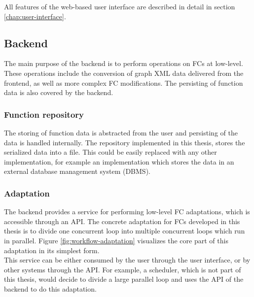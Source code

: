 \documentclass[a4paper,top=25mm,bottom=25mm,12pt,pdftex,halfparskip,twoside,openany,bibtotoc,numbers=noenddot]{scrbook}
\begin{document}
All features of the web-based user interface are described in detail in section \ref{chap:user-interface}.

\subsection{Backend}

The main purpose of the backend is to perform operations on FCs at low-level. These operations include the conversion of graph XML data delivered from the frontend, as well as more complex FC modifications. The persisting of function data is also covered by the backend.

\subsubsection{Function repository}

The storing of function data is abstracted from the user and persisting of the data is handled internally.
The repository implemented in this thesis, stores the serialized data into a file. This could be easily replaced with any other implementation, for example an implementation which stores the data in an external database management system (DBMS).

\subsubsection{Adaptation}

The backend provides a service for performing low-level FC adaptations, which is accessible through an API.
The concrete adaptation for FCs developed in this thesis is to divide one concurrent loop into multiple concurrent loops which run in parallel.
Figure \ref{fig:workflow-adaptation} visualizes the core part of this adaptation in its simplest form.\\
This service can be either consumed by the user through the user interface, or by other systems through the API. For example, a scheduler, which is not part of this thesis, would decide to divide a large parallel loop and uses the API of the backend to do this adaptation.
\end{document}
